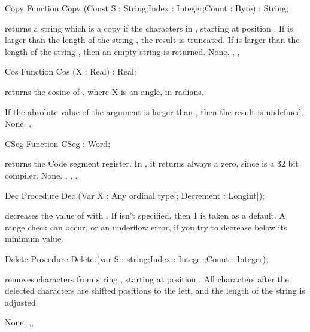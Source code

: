 \documentclass{report}
\begin{document}


\begin{function}{Copy}
\Declaration
Function Copy (Const S : String;Index : Integer;Count : Byte) : String;

\Description
{} returns a string which is a copy if the  characters
in , starting at position . If  is larger than
the length of the string , the result is truncated.
If  is larger than the length of the string , then an
empty string is returned.
\Errors
None.
\SeeAlso
{}, , 
\end{function}


\begin{function}{Cos}
\Declaration
Function Cos (X : Real) : Real;

\Description
{} returns the cosine of , where X is an angle, in radians.

If the absolute value of the argument is larger than , then the
result is undefined.
\Errors
None.
\SeeAlso
{}, 
\end{function}


\begin{function}{CSeg}
\Declaration
Function CSeg  : Word;

\Description
{} returns the Code segment register. In \fpc, it returns always a
zero, since \fpc is a 32 bit compiler.
\Errors
None.
\SeeAlso
{}, , , 
\end{function}


\begin{procedure}{Dec}
\Declaration
Procedure Dec (Var X : Any ordinal type[; Decrement : Longint]);

\Description
{} decreases the value of  with .
If  isn't specified, then 1 is taken as a default.
\Errors
A range check can occur, or an underflow error, if you try to decrease 
below its minimum value.
\SeeAlso
{}
\end{procedure}


\begin{procedure}{Delete}
\Declaration
Procedure Delete (var S : string;Index : Integer;Count : Integer);

\Description
{} removes  characters from string , starting
at position . All characters after the delected characters are 
shifted  positions to the left, and the length of the string is adjusted.

\Errors
None.
\SeeAlso
{},,
\end{procedure}
\end{document}
